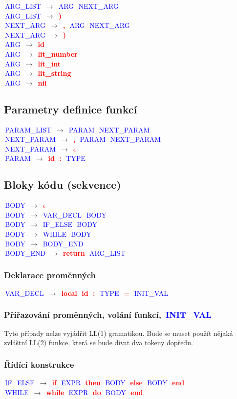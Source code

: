 \documentclass[a4paper]{article}
\theoremstyle{definition}
\newcommand{\nter}[1]{\textcolor{blue}{\,#1\,}}
\newcommand{\ter}[1]{\textbf{\textcolor{red}{\,#1\,}}}
\newcommand{\grule}[2]{{\small\nter{#1} $\to$ #2}\\}
\begin{document}
\begin{multicols}{2}
	\grule{ARG\_LIST}{\nter{ARG} \nter{NEXT\_ARG}}
	\grule{ARG\_LIST}{\ter{)}}
	\grule{NEXT\_ARG}{\ter{,} \nter{ARG} \nter{NEXT\_ARG}}
	\grule{NEXT\_ARG}{\ter{)}}
	\grule{ARG}{\ter{id}}
	\grule{ARG}{\ter{lit\_number}}
	\grule{ARG}{\ter{lit\_int}}
	\grule{ARG}{\ter{lit\_string}}
	\grule{ARG}{\ter{nil}}

	\subsection{Parametry definice funkcí}

	\grule{PARAM\_LIST}{\nter{PARAM} \nter{NEXT\_PARAM}}
	\grule{NEXT\_PARAM}{\ter{,} \nter{PARAM} \nter{NEXT\_PARAM}}
	\grule{NEXT\_PARAM}{\ter{$\epsilon$}}
	\grule{PARAM}{\ter{id} \ter{:} \nter{TYPE}}

	\subsection{Bloky kódu (sekvence)}

	\grule{BODY}{\ter{$\epsilon$}}
	\grule{BODY}{\nter{VAR\_DECL} \nter{BODY}}
	\grule{BODY}{\nter{IF\_ELSE} \nter{BODY}}
	\grule{BODY}{\nter{WHILE} \nter{BODY}}
	\grule{BODY}{\nter{BODY\_END}}
	\grule{BODY\_END}{\ter{return} \nter{ARG\_LIST}}

	\subsubsection{Deklarace proměnných}
	\grule{VAR\_DECL}{\ter{local} \ter{id} \ter{:} \nter{TYPE} \ter{=} \nter{INIT\_VAL}}
	\subsubsection{Přiřazování proměnných, volání funkcí, \nter{INIT\_VAL}}

	Tyto případy nelze vyjádřit LL(1) gramatikou. Bude se muset použít nějaká zvláštní LL(2) funkce, která se bude dívat dva tokeny dopředu.

	\subsubsection{Řídící konstrukce}

	\grule{IF\_ELSE}{\ter{if} \nter{EXPR} \ter{then} \nter{BODY} \ter{else} \nter{BODY} \ter{end}}
	\grule{WHILE}{\ter{while} \nter{EXPR} \ter{do} \nter{BODY} \ter{end}}

	\end{multicols}
\end{document}
